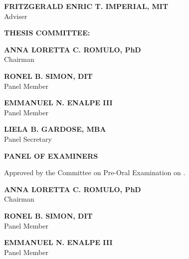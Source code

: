 \documentclass{research}
\begin{document}
\vspace{1em}
\begin{center}
\textbf{FRITZGERALD ENRIC T. IMPERIAL, MIT}\\
Adviser
\end{center}

\vspace{1em}
\begin{center}
\textbf{THESIS COMMITTEE:}
\end{center}

\vspace{0.5em}
\begin{center}
\textbf{ANNA LORETTA C. ROMULO, PhD}\\
Chairman
\end{center}

\vspace{0.5em}
\begin{minipage}{0.45\textwidth}
\centering
\textbf{RONEL B. SIMON, DIT}\\
Panel Member
\end{minipage}
\hfill
\begin{minipage}{0.45\textwidth}
\centering
\textbf{EMMANUEL N. ENALPE III}\\
Panel Member
\end{minipage}

\vspace{0.7em}
\begin{center}
\textbf{LIELA B. GARDOSE, MBA}\\
Panel Secretary
\end{center}

\vspace{1em}
\begin{center}
\textbf{PANEL OF EXAMINERS}
\end{center}

\noindent Approved by the Committee on Pre-Oral Examination on
\underline{\hspace{4cm}}.

\vspace{0.5em}
\begin{center}
\textbf{ANNA LORETTA C. ROMULO, PhD}\\
Chairman
\end{center}

\vspace{0.5em}
\begin{minipage}{0.45\textwidth}
\centering
\textbf{RONEL B. SIMON, DIT}\\
Panel Member
\end{minipage}
\hfill
\begin{minipage}{0.45\textwidth}
\centering
\textbf{EMMANUEL N. ENALPE III}\\
Panel Member
\end{minipage}
\end{document}
